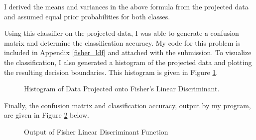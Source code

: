 \documentclass[fleqn]{article}
\begin{document}
\begin{enumerate}
		I derived the means and variances in the above formula from the projected data and assumed equal prior probabilities for both classes. 
		
		Using this classifier on the projected data, I was able to generate a confusion matrix and determine the classification accuracy. My code for this problem is included in Appendix \ref{fisher_ldf} and attached with the submission. To visualize the classification, I also generated a histogram of the projected data and plotting the resulting decision boundaries. This histogram is given in Figure \ref{fisher_ldf_histogram}.
		
		\begin{figure}[H]				
			\centerline{}
			\caption{Histogram of Data Projected onto Fisher's Linear Discriminant.}
			\label{fisher_ldf_histogram}
		\end{figure}
		
		Finally, the confusion matrix and classification accuracy, output by my program, are given in Figure \ref{fisher_ldf_stats} below.
		
		\begin{figure}[H]				
			\centerline{}
			\caption{Output of Fisher Linear Discriminant Function}
			\label{fisher_ldf_stats}
		\end{figure}
	\end{enumerate}
	
\end{document}
